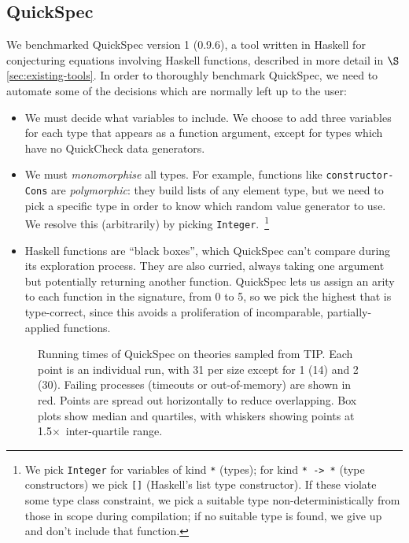 \subsection{QuickSpec}

We benchmarked QuickSpec version 1 (0.9.6), a tool written in Haskell for
conjecturing equations involving Haskell functions, described in more detail in
$\S$\ref{sec:existing-tools}. In order to thoroughly benchmark QuickSpec, we
need to automate some of the decisions which are normally left up to the user:

\begin{sloppypar}
  \begin{itemize}
  \item We must decide what variables to include. We choose to add three
    variables for each type that appears as a function argument, except for
    types which have no QuickCheck data generators.
  \item We must \emph{monomorphise} all types. For example, functions like
    \texttt{constructor-Cons} are \emph{polymorphic}: they build lists of any
    element type, but we need to pick a specific type in order to know which
    random value generator to use. We resolve this (arbitrarily) by picking
    \texttt{Integer}.~\footnote{We pick \texttt{Integer} for variables of kind
      \texttt{*} (types); for kind \texttt{* -> *} (type constructors) we pick
      \texttt{[]} (Haskell's list type constructor). If these violate some
      type class constraint, we pick a suitable type non-deterministically from
      those in scope during compilation; if no suitable type is found, we give
      up and don't include that function.}
  \item Haskell functions are ``black boxes'', which QuickSpec can't compare
    during its exploration process. They are also curried, always taking one
    argument but potentially returning another function. QuickSpec lets us
    assign an arity to each function in the signature, from 0 to 5, so we pick
    the highest that is type-correct, since this avoids a proliferation of
    incomparable, partially-applied functions.
  \end{itemize}
\end{sloppypar}

\begin{figure}
  \centering
  
  \caption{Running times of QuickSpec on theories sampled from TIP. Each point
    is an individual run, with 31 per size except for 1 (14) and 2 (30). Failing
    processes (timeouts or out-of-memory) are shown in red. Points are spread
    out horizontally to reduce overlapping. Box plots show median and quartiles,
    with whiskers showing points at 1.5$\times$~inter-quartile range.}
  \label{figure:quickspec_runtimes}
\end{figure}

